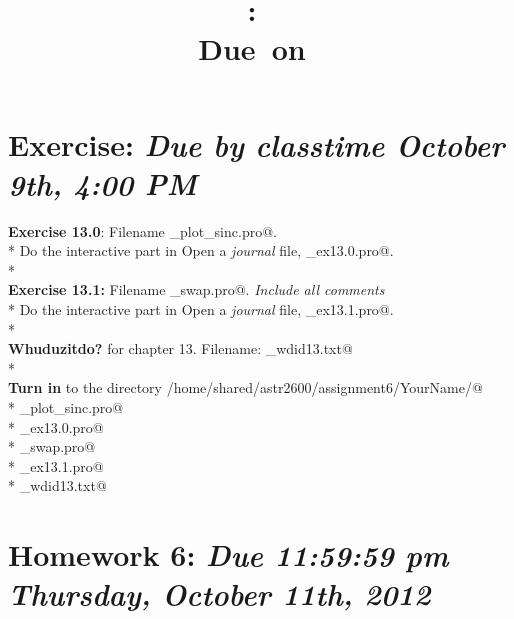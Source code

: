 \documentclass{article}
\title{\vspace{2in}\textmd{\textbf{\hmwkClass:\ \hmwkTitle}}\\\normalsize\vspace{0.1in}\small{Due\ on\ \hmwkDueDate}\\\vspace{0.1in}\large{}\vspace{3in}}
\date{}
\newcommand{\hmwkDueDate}{October 9th, 4:00 PM}
\begin{document}
 \begin{spacing}{1.0}
 \newpage
 
 
 
 \section{\textbf{Exercise:} \emph{  Due by classtime \hmwkDueDate}}
 
 \textbf{Exercise 13.0}: Filename \verb@yourName_plot_sinc.pro@.\\* 
 Do the interactive part in Open a \emph{journal} file, \verb@yourName_ex13.0.pro@.\\* 
 ~\\ 
 \textbf{Exercise 13.1: }Filename \verb@yourName_swap.pro@.  \emph{Include all comments}\\* 
 Do the interactive part in Open a \emph{journal} file, \verb@yourName_ex13.1.pro@.\\* 
 ~\\ 
 \textbf{Whuduzitdo?} for chapter 13.  Filename: \verb@yourName_wdid13.txt@\\* 
 ~\\ 
 \textbf{Turn in} to the directory   \verb@/home/shared/astr2600/assignment6/YourName/@\\* 
 \verb@yourName_plot_sinc.pro@\\* 
 \verb@yourName_ex13.0.pro@\\* 
 \verb@yourName_swap.pro@\\* 
 \verb@yourName_ex13.1.pro@\\* 
 \verb@yourName_wdid13.txt@

 \section{Homework 6: \emph{Due 11:59:59 pm Thursday, October 11th, 2012}}


\end{spacing}
\end{document}
